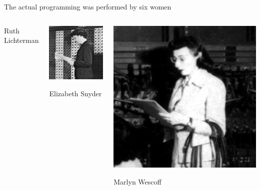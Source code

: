 \documentclass[aspectratio=169]{beamer}
\begin{document}
\begin{frame}{The actual programming was performed by six women}
\begin{columns}[t]
\begin{center}
Ruth Lichterman
\end{center}

\begin{center}
\includegraphics[width=\linewidth]{Betty-Snyder.jpg}

Elizabeth Snyder
\end{center}

\begin{center}
\includegraphics[width=\linewidth]{Marlyn-Meltzer.jpg}

Marlyn Wescoff
\end{center}
\end{columns}
\end{frame}
\end{document}
